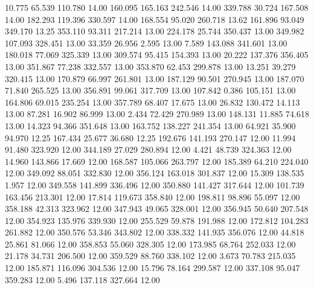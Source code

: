   10.775   65.539  110.780        14.00
 160.095  165.163  242.546        14.00
 339.788   30.724  167.508        14.00
 182.293  119.396  330.597        14.00
 168.554   95.020  260.718        13.62
 161.896   93.049  349.170        13.25
 353.110   93.311  217.214        13.00
 224.178   25.744  350.437        13.00
 349.982  107.093  328.451        13.00
  33.359   26.956    2.595        13.00
   7.589  143.088  341.601        13.00
 180.018   77.069  325.339        13.00
 309.574   95.415  154.393        13.00
  20.222  137.376  356.405        13.00
 351.867   77.238  332.557        13.00
 353.870   62.453  299.878        13.00
  13.251   39.279  320.415        13.00
 170.879   66.997  261.801        13.00
 187.129   90.501  270.945        13.00
 187.070   71.840  265.525        13.00
 356.891   99.061  317.709        13.00
 107.842    0.386  105.151        13.00
 164.806   69.015  235.254        13.00
 357.789   68.407   17.675        13.00
  26.832  130.472   14.113        13.00
  87.281   16.902   86.999        13.00
   2.434   72.429  270.989        13.00
 148.131   11.885   74.618        13.00
  14.323   94.366  351.648        13.00
 163.752  138.227  241.354        13.00
  64.921   35.900   94.970        12.25
 167.434   25.677   36.680        12.25
 192.676  141.193  270.147        12.00
  11.994   91.480  323.920        12.00
 344.189   27.029  280.894        12.00
   4.421   48.739  324.363        12.00
  14.960  143.866   17.669        12.00
 168.587  105.066  263.797        12.00
 185.389   64.210  224.040        12.00
 349.092   88.051  332.830        12.00
 356.124  163.018  301.837        12.00
  15.309  138.535    1.957        12.00
 349.558  141.899  336.496        12.00
 350.880  141.427  317.644        12.00
 101.739  163.456  213.301        12.00
  17.814  119.673  358.840        12.00
 198.811   98.896   55.097        12.00
 358.188   42.313  323.962        12.00
 347.943   49.065  328.001        12.00
 356.945   50.640  207.548        12.00
 354.923  135.976  339.930        12.00
 255.529   59.878  191.988        12.00
 172.812  104.283  261.882        12.00
 350.576   53.346  343.802        12.00
 338.332  141.935  356.076        12.00
  44.818   25.861   81.066        12.00
 358.853   55.060  328.305        12.00
 173.985   68.764  252.033        12.00
  21.178   34.731  206.500        12.00
 359.529   88.760  338.102        12.00
   3.673   70.783  215.035        12.00
 185.871  116.096  304.536        12.00
  15.796   78.164  299.587        12.00
 337.108   95.047  359.283        12.00
   5.496  137.118  327.664        12.00
